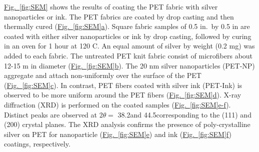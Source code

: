 \documentclass[journal=jacsat,manuscript=article]{achemso}
\newcommand{\figref}[2][]{\hyperref[#2]{Fig.~\ref{#2}#1}}
\begin{document}
\figref{fig:SEM} shows the results of coating the PET fabric with silver nanoparticles or ink.  
The PET fabrics are coated by drop casting and then thermally cured
(\figref[a]{fig:SEM}).  Square fabric samples of 
0.5 in.~by 0.5 in are coated with either silver nanoparticles or ink by drop casting, followed by curing in an oven for 1 hour at 120 \degree C. An equal amount of silver by weight (0.2 mg) was added to each fabric. 
The untreated PET knit fabric consist of microfibers about 12-15 \micro m in diameter (\figref[b]{fig:SEM}). %
The 20 nm silver nanoparticles (PET-NP) aggregate and attach non-uniformly over the surface of the PET (\figref[c]{fig:SEM}).  
In contrast, PET fibers %
coated with silver ink (PET-Ink) 
is observed to be more uniform around the PET fibers (\figref[d]{fig:SEM}). 
X-ray diffraction (XRD) is performed on the coated samples (\figref[e-f]{fig:SEM}). %
Distinct peaks are observed at 2$\theta =$ 38.2\degree and 44.5\degree corresponding to the (111) and (200) crystal planes. 
The XRD analysis confirms the presence of poly-crystalline silver on PET for nanoparticle (\figref[e]{fig:SEM}) and ink (\figref[f]{fig:SEM}) coatings, respectively. 



\end{document}
